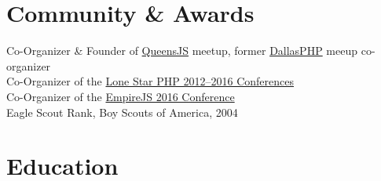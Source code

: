 \documentclass{resume}
\begin{document}
\section{Community \& Awards}

Co-Organizer \& Founder of \href{http://queensjs.com/}{QueensJS} meetup, former \href{http://www.meetup.com/dallasphp/}{DallasPHP} meeup co-organizer
\\
Co-Organizer of the \href{http://lonestarphp.com/}{Lone Star PHP 2012--2016 Conferences}
\\
Co-Organizer of the \href{http://empirejs.org/}{EmpireJS 2016 Conference}
\\
Eagle Scout Rank, Boy Scouts of America, 2004

\section{Education}

\end{document}
